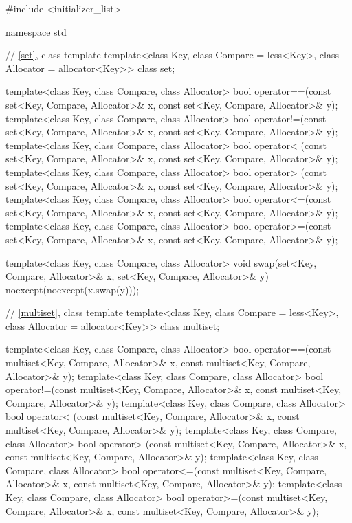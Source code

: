 \begin{codeblock}
#include <initializer_list>

namespace std {
  // \ref{set}, class template 
  template<class Key, class Compare = less<Key>, class Allocator = allocator<Key>>
    class set;

  template<class Key, class Compare, class Allocator>
    bool operator==(const set<Key, Compare, Allocator>& x,
                    const set<Key, Compare, Allocator>& y);
  template<class Key, class Compare, class Allocator>
    bool operator!=(const set<Key, Compare, Allocator>& x,
                    const set<Key, Compare, Allocator>& y);
  template<class Key, class Compare, class Allocator>
    bool operator< (const set<Key, Compare, Allocator>& x,
                    const set<Key, Compare, Allocator>& y);
  template<class Key, class Compare, class Allocator>
    bool operator> (const set<Key, Compare, Allocator>& x,
                    const set<Key, Compare, Allocator>& y);
  template<class Key, class Compare, class Allocator>
    bool operator<=(const set<Key, Compare, Allocator>& x,
                    const set<Key, Compare, Allocator>& y);
  template<class Key, class Compare, class Allocator>
    bool operator>=(const set<Key, Compare, Allocator>& x,
                    const set<Key, Compare, Allocator>& y);

  template<class Key, class Compare, class Allocator>
    void swap(set<Key, Compare, Allocator>& x,
              set<Key, Compare, Allocator>& y)
      noexcept(noexcept(x.swap(y)));

  // \ref{multiset}, class template 
  template<class Key, class Compare = less<Key>, class Allocator = allocator<Key>>
    class multiset;

  template<class Key, class Compare, class Allocator>
    bool operator==(const multiset<Key, Compare, Allocator>& x,
                    const multiset<Key, Compare, Allocator>& y);
  template<class Key, class Compare, class Allocator>
    bool operator!=(const multiset<Key, Compare, Allocator>& x,
                    const multiset<Key, Compare, Allocator>& y);
  template<class Key, class Compare, class Allocator>
    bool operator< (const multiset<Key, Compare, Allocator>& x,
                    const multiset<Key, Compare, Allocator>& y);
  template<class Key, class Compare, class Allocator>
    bool operator> (const multiset<Key, Compare, Allocator>& x,
                    const multiset<Key, Compare, Allocator>& y);
  template<class Key, class Compare, class Allocator>
    bool operator<=(const multiset<Key, Compare, Allocator>& x,
                    const multiset<Key, Compare, Allocator>& y);
  template<class Key, class Compare, class Allocator>
    bool operator>=(const multiset<Key, Compare, Allocator>& x,
                    const multiset<Key, Compare, Allocator>& y);

}
\end{codeblock}
